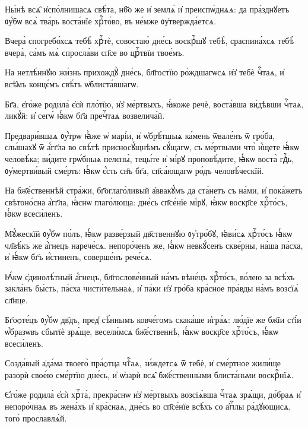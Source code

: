 \hKv Ны́нѣ всѧ̑ и҆спо́лнишасѧ свѣ́та, нб҃о же и҆ землѧ̀ и҆  преиспѡ́днѧѧ: да пра́зднꙋетъ ᲂу҆́бѡ всѧ̀ тва́рь воста́нїе  хрⷭ҇то́во, въ не́мже ᲂу҆твержда́етсѧ. 

\hKv Вчера̀ спогребо́хсѧ тебѣ̀ хрⷭ҇тѐ, совостаю̀ дне́сь  воскрⷭ҇шꙋ тебѣ̀, сраспина́хсѧ тебѣ̀ вчера̀, са́мъ мѧ̀  спросла́ви сп҃се во црⷭ҇твїи твое́мъ. 

\hKv На нетлѣ́ннꙋю жи́знь прихождꙋ̀ дне́сь, бл҃гостїю  ро́ждшагѡсѧ и҆з̾ тебѐ чⷭ҇таѧ, и҆ всѣ̑мъ концє́мъ свѣ́тъ  ѡ҆блиста́вшагѡ.  

\hKv Бг҃а, є҆го́же родила̀ є҆сѝ пло́тїю, и҆з̾  ме́ртвыхъ, ꙗ҆́коже речѐ, воста́вша ви́дѣвши чⷭ҇таѧ,  ликꙋ́й: и҆ сегѡ̀ ꙗ҆́кѡ бг҃а пречⷭ҇таѧ возвелича́й. 


\hKv Предвари́вшаѧ ᲂу҆́трѡ ꙗ҆̀же ѡ҆  марі́и, и҆ ѡ҆брѣ́тшыѧ ка́мень ѿвале́нъ ѿ гро́ба,  слы́шахꙋ ѿ а҆́гг҃ла во свѣ́тѣ присносꙋ́щнѣмъ сꙋ́щагѡ,  съ ме́ртвыми что̀ и҆́щете ꙗ҆́кѡ человѣ́ка; ви́дите  грѡ́бныѧ пелєны̀, тецы́те и҆ мі́рꙋ проповѣ́дите, ꙗ҆́кѡ  воста̀ гдⷭ҇ь, ᲂу҆мертви́вый сме́рть: ꙗ҆́кѡ є҆́сть сн҃ъ  бг҃а, сп҃са́ющагѡ ро́дъ человѣ́ческїй.  
%

\hKv На бж҃е́ственнѣй стра́жи, бг҃оглаго́ливый  а҆ввакꙋ́мъ да ста́нетъ съ на́ми, и҆ пока́жетъ свѣтоно́сна  а҆́гг҃ла, ꙗ҆́снѡ глаго́люща: дне́сь сп҃се́нїе мі́рꙋ, ꙗ҆́кѡ  воскр҃се хрⷭ҇то́съ, ꙗ҆́кѡ всеси́ленъ. 

\hKv Мꙋ́жескїй ᲂу҆́бѡ по́лъ, ꙗ҆́кѡ разве́рзый дв҃ственнꙋю  ᲂу҆тро́бꙋ, ꙗ҆ви́сѧ хрⷭ҇то́съ ꙗ҆́кѡ чл҃вѣ́къ же а҆́гнецъ  нарече́сѧ. непоро́ченъ же,  ꙗ҆́кѡ  невкꙋ́сенъ скве́рны, на́ша па́сха, и҆ ꙗ҆́кѡ бг҃ъ  и҆́стиненъ, соверше́нъ рече́сѧ. 

\hKv Ꙗ҆́кѡ є҆динолѣ́тный а҆́гнецъ, бл҃гослове́нный на́мъ  вѣне́цъ хрⷭ҇то́съ, во́лею за всѣ́хъ закла́нъ бы́сть,  па́сха чисти́тельнаѧ, и҆ па́ки и҆з̾ гро́ба кра́сное пра́вды  на́мъ возсїѧ̀ сл҃нце. 

\hKv Бг҃оѻте́цъ ᲂу҆́бѡ дв҃дъ, пред̾ сѣ́ннымъ ковче́гомъ  скака́ше и҆гра́ѧ: лю́дїе же бж҃їи ст҃і́и ѡ҆́бразѡвъ сбытїѐ  зрѧ́ще, весели́мсѧ бж҃е́ственнѣ, ꙗ҆́кѡ воскр҃се хрⷭ҇то́съ,  ꙗ҆́кѡ всеси́ленъ.  

\hKv Созда́вый а҆да́ма твоего̀ пра́ѻтца чтⷭ҇аѧ,  зи́ждетсѧ ѿ тебѐ, и҆ сме́ртное жили́ще разорѝ свое́ю  сме́ртїю дне́сь, и҆ ѡ҆зарѝ всѧ̑ бж҃е́ственными блиста́ньми  воскрⷭ҇нїѧ. 

\hKv Є҆го́же родила̀ є҆сѝ хрⷭ҇та̀, прекра́снѡ и҆з̾  ме́ртвыхъ возсїѧ́вша чⷭ҇таѧ зрѧ́щи, до́браѧ и҆ непоро́чнаѧ  въ жена́хъ и҆ кра́снаѧ, дне́сь во сп҃се́нїе всѣ́хъ со  а҆пⷭ҇лы ра́дꙋющисѧ, того̀ прославлѧ́й.  
%


